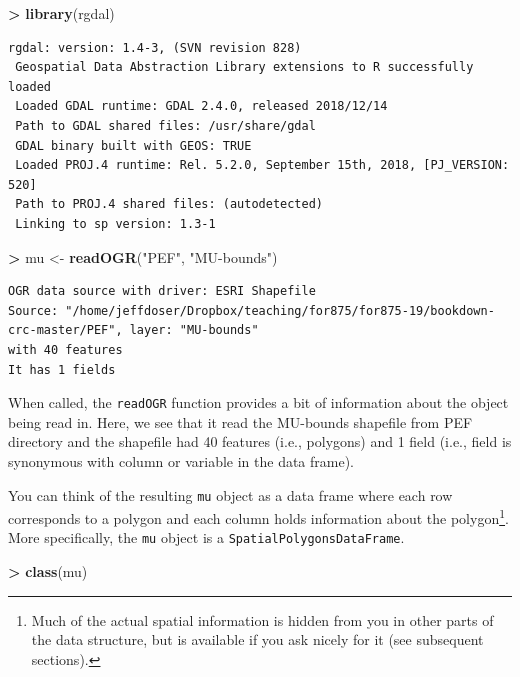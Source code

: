 \documentclass[]{krantz}
\makeatletter
\newenvironment{Shaded}{\begin{snugshade}}{\end{snugshade}}
\newcommand{\KeywordTok}[1]{\textcolor[rgb]{0.27,0.27,0.27}{\textbf{#1}}}
\newcommand{\NormalTok}[1]{#1}
\newcommand{\OperatorTok}[1]{\textcolor[rgb]{0.43,0.43,0.43}{\textbf{#1}}}
\newcommand{\StringTok}[1]{\textcolor[rgb]{0.5,0.5,0.5}{#1}}
\newenvironment{kframe}{%
\medskip{}
\setlength{\fboxsep}{.8em}
 \def\at@end@of@kframe{}%
 \ifinner\ifhmode%
  \def\at@end@of@kframe{\end{minipage}}%
  \begin{minipage}{\columnwidth}%
 \fi\fi%
 \def\FrameCommand##1{\hskip\@totalleftmargin \hskip-\fboxsep
 \colorbox{shadecolor}{##1}\hskip-\fboxsep
     \hskip-\linewidth \hskip-\@totalleftmargin \hskip\columnwidth}%
 \MakeFramed {\advance\hsize-\width
   \@totalleftmargin\z@ \linewidth\hsize
   \@setminipage}}%
 {\par\unskip\endMakeFramed%
 \at@end@of@kframe}
\renewenvironment{Shaded}{\begin{kframe}}{\end{kframe}}
\makeatother
\begin{document}
\begin{Shaded}
\begin{Highlighting}[]
\OperatorTok{>}\StringTok{ }\KeywordTok{library}\NormalTok{(rgdal)}
\end{Highlighting}
\end{Shaded}

\begin{verbatim}
rgdal: version: 1.4-3, (SVN revision 828)
 Geospatial Data Abstraction Library extensions to R successfully loaded
 Loaded GDAL runtime: GDAL 2.4.0, released 2018/12/14
 Path to GDAL shared files: /usr/share/gdal
 GDAL binary built with GEOS: TRUE 
 Loaded PROJ.4 runtime: Rel. 5.2.0, September 15th, 2018, [PJ_VERSION: 520]
 Path to PROJ.4 shared files: (autodetected)
 Linking to sp version: 1.3-1 
\end{verbatim}

\begin{Shaded}
\begin{Highlighting}[]
\OperatorTok{>}\StringTok{ }\NormalTok{mu <-}\StringTok{ }\KeywordTok{readOGR}\NormalTok{(}\StringTok{"PEF"}\NormalTok{, }\StringTok{"MU-bounds"}\NormalTok{)}
\end{Highlighting}
\end{Shaded}

\begin{verbatim}
OGR data source with driver: ESRI Shapefile 
Source: "/home/jeffdoser/Dropbox/teaching/for875/for875-19/bookdown-crc-master/PEF", layer: "MU-bounds"
with 40 features
It has 1 fields
\end{verbatim}

When called, the \texttt{readOGR} function provides a bit of information about the object being read in. Here, we see that it read the MU-bounds shapefile from PEF directory and the shapefile had 40 features (i.e., polygons) and 1 field (i.e., field is synonymous with column or variable in the data frame).

You can think of the resulting \texttt{mu} object as a data frame where each row corresponds to a polygon and each column holds information about the polygon\footnote{Much of the actual spatial information is hidden from you in other parts of the data structure, but is available if you ask nicely for it (see subsequent sections).}. More specifically, the \texttt{mu} object is a \texttt{SpatialPolygonsDataFrame}.

\begin{Shaded}
\begin{Highlighting}[]
\OperatorTok{>}\StringTok{ }\KeywordTok{class}\NormalTok{(mu)}
\end{Highlighting}
\end{Shaded}
\end{document}
